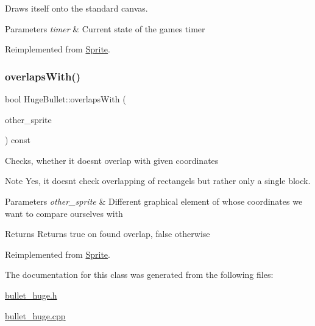 Draws itself onto the standard canvas.


\begin{DoxyParams}{Parameters}
{\em timer} & Current state of the games timer \\
\hline
\end{DoxyParams}


Reimplemented from \hyperlink{classSprite_aa41512617e8a1626bade15cbbdfb3f79}{Sprite}.

\mbox{\label{classHugeBullet_a6a617486739894eacb79711c8a24bb9d}} 
\subsubsection{\texorpdfstring{overlaps\+With()}{overlapsWith()}}
{\footnotesize\ttfamily bool Huge\+Bullet\+::overlaps\+With (\begin{DoxyParamCaption}\item[{\hyperlink{classSprite}{Sprite} $\ast$}]{other\+\_\+sprite }\end{DoxyParamCaption}) const\hspace{0.3cm}{\ttfamily [virtual]}}

Checks, whether it doesn\textquotesingle{}t overlap with given coordinates \begin{DoxyNote}{Note}
Yes, it doesn\textquotesingle{}t check overlapping of rectangels but rather only a single block.
\end{DoxyNote}

\begin{DoxyParams}{Parameters}
{\em other\+\_\+sprite} & Different graphical element of whose coordinates we want to compare ourselves with \\
\hline
\end{DoxyParams}
\begin{DoxyReturn}{Returns}
Returns true on found overlap, false otherwise 
\end{DoxyReturn}


Reimplemented from \hyperlink{classSprite_a631928eb8d8fabce4f888c6ed76c0885}{Sprite}.



The documentation for this class was generated from the following files\+:\begin{DoxyCompactItemize}
\item 
\hyperlink{bullet__huge_8h}{bullet\+\_\+huge.\+h}\item 
\hyperlink{bullet__huge_8cpp}{bullet\+\_\+huge.\+cpp}\end{DoxyCompactItemize}
